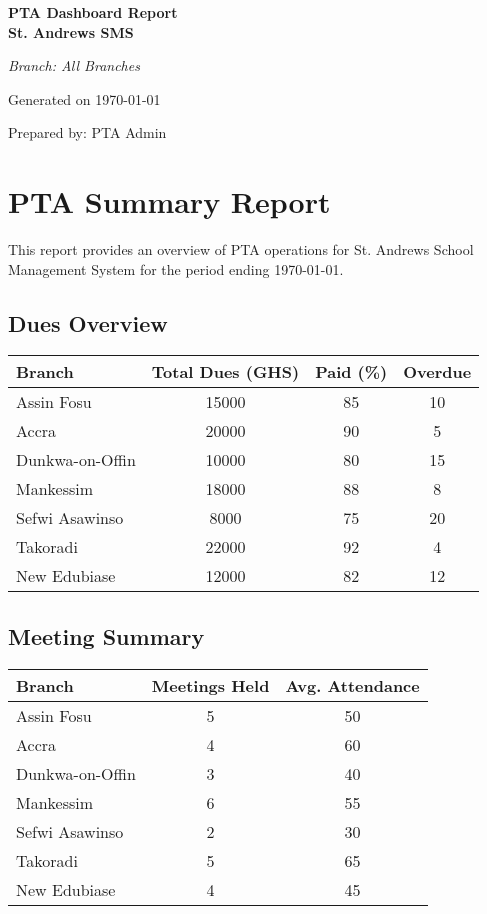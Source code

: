 \documentclass[a4paper,12pt]{article}
\begin{document}
\begin{titlepage}
    \centering
    \vspace*{2cm}
    {\color{twilight}\huge\bfseries PTA Dashboard Report \\ St. Andrews SMS \par}
    \vspace{1cm}
    {\Large\itshape Branch: All Branches \par}
    \vspace{0.5cm}
    {\large Generated on \today \par}
    \vspace{2cm}
    {\large Prepared by: PTA Admin \par}
\end{titlepage}

\section*{PTA Summary Report}
This report provides an overview of PTA operations for St. Andrews School Management System for the period ending \today.

\subsection*{Dues Overview}
\begin{tabular}{l S[table-format=5.0] c c}
    \toprule
    \textbf{Branch} & \textbf{Total Dues (GHS)} & \textbf{Paid (\%)} & \textbf{Overdue} \\
    \midrule
    Assin Fosu & 15000 & 85 & 10 \\
    Accra & 20000 & 90 & 5 \\
    Dunkwa-on-Offin & 10000 & 80 & 15 \\
    Mankessim & 18000 & 88 & 8 \\
    Sefwi Asawinso & 8000 & 75 & 20 \\
    Takoradi & 22000 & 92 & 4 \\
    New Edubiase & 12000 & 82 & 12 \\
    \bottomrule
\end{tabular}

\subsection*{Meeting Summary}
\begin{tabular}{l c c}
    \toprule
    \textbf{Branch} & \textbf{Meetings Held} & \textbf{Avg. Attendance} \\
    \midrule
    Assin Fosu & 5 & 50 \\
    Accra & 4 & 60 \\
    Dunkwa-on-Offin & 3 & 40 \\
    Mankessim & 6 & 55 \\
    Sefwi Asawinso & 2 & 30 \\
    Takoradi & 5 & 65 \\
    New Edubiase & 4 & 45 \\
    \bottomrule
\end{tabular}
\end{document}
